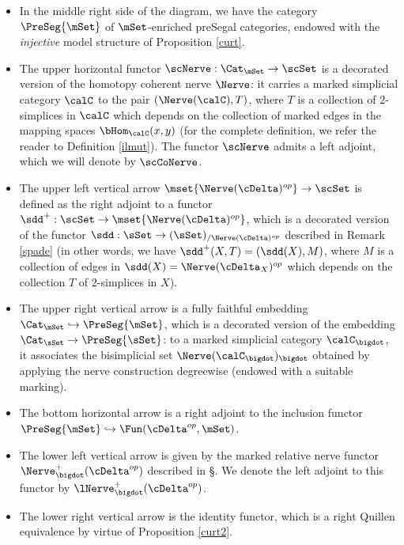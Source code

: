 \begin{theorem}
\begin{itemize}
\item[$(A6)$] In the middle right side of the diagram, we have the category
$\PreSeg{\mSet}$ of $\mSet$-enriched preSegal categories, endowed with
the {\it injective} model structure of Proposition \ref{curt}.

\item[$(B1)$] The upper horizontal functor $\scNerve: \Cat_{\mSet} \rightarrow \scSet$
is a decorated version of the homotopy coherent nerve $\Nerve$: it carries a marked
simplicial category $\calC$ to the pair $( \Nerve(\calC), T)$, where $T$ is a collection
of $2$-simplices in $\calC$ which depends on the collection of marked edges in
the mapping spaces $\bHom_{\calC}(x,y)$ (for the complete definition, we
refer the reader to Definition \ref{ilmut}). The functor $\scNerve$ admits a left adjoint, which
we will denote by $\scCoNerve$.

\item[$(B2)$] The upper left vertical
arrow $\mset{ \Nerve(\cDelta)^{op} } \rightarrow \scSet$ is defined as the right
adjoint to a functor $\sdd^{+}: \scSet \rightarrow \mset{ \Nerve(\cDelta)^{op} }$,
which is a decorated version of the functor $\sdd: \sSet \rightarrow (\sSet)_{/ \Nerve(\cDelta)^{op}}$
described in Remark \ref{spade} (in other words, we have $\sdd^{+}(X,T)= (\sdd(X), M)$, where
$M$ is a collection of edges in $\sdd(X) = \Nerve( \cDelta_{X})^{op}$ which depends on the collection $T$ of $2$-simplices in $X$). 

\item[$(B3)$] The upper right vertical arrow is a fully faithful embedding
$\Cat_{\mSet} \hookrightarrow \PreSeg{\mSet}$, which is a decorated
version of the embedding $\Cat_{\sSet} \rightarrow \PreSeg{\sSet}$:
to a marked simplicial category $\calC_{\bigdot}$, it associates the bisimplicial
set $\Nerve( \calC_{\bigdot})_{\bigdot}$ obtained by applying the nerve construction degreewise
(endowed with a suitable marking).

\item[$(B4)$] The bottom horizontal arrow is a right adjoint to the inclusion
functor $\PreSeg{\mSet} \hookrightarrow \Fun( \cDelta^{op}, \mSet)$.

\item[$(B5)$] The lower left vertical arrow is given by the marked relative nerve
functor $\Nerve^{+}_{\bigdot}( \cDelta^{op} )$ described in \S {}.
We denote the left adjoint to this functor by $\lNerve^{+}_{\bigdot}( \cDelta^{op} )$. 

\item[$(B6)$] The lower right vertical arrow is the identity functor, which is
a right Quillen equivalence by virtue of Proposition \ref{curt2}.
\end{itemize}


\end{theorem}

